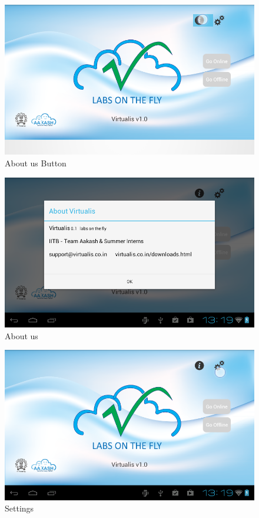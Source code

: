 \documentclass[12pt]{report}
\begin{document}
\begin{figure}[H]
 \centering
 \includegraphics[width=15cm]{./5.png}
 \caption{About us Button\label{fig:5}}
\end{figure}

\begin{figure}[H]
 \centering
 \includegraphics[width=15cm]{./6.png}
 \caption{About us\label{fig:6}}
\end{figure}

\begin{figure}[H]
 \centering
 \includegraphics[width=15cm]{./7.png}
 \caption{Settings \label{fig:7}}
\end{figure}
\end{document}
